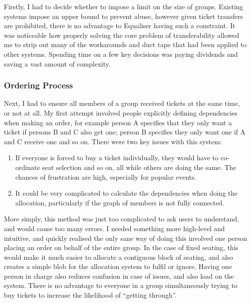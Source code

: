 \documentclass[12pt,a4paper]{bhamdissertation}
\begin{document}
Firstly, I had to decide whether to impose a limit on the size of groups. Existing systems impose an upper bound to prevent abuse, however given ticket transfers are prohibited, there is no advantage to Equaliser having such a constraint. It was noticeable how properly solving the core problem of transferability allowed me to strip out many of the workarounds and duct tape that had been applied to other systems. Spending time on a few key decisions was paying dividends and saving a vast amount of complexity.

\subsubsection{Ordering Process}

Next, I had to ensure all members of a group received tickets at the same time, or not at all. My first attempt involved people explicitly defining dependencies when making an order, for example person A specifies that they only want a ticket if persons B and C also get one; person B specifies they only want one if A and C receive one and so on. There were two key issues with this system:

\begin{enumerate}
    \item If everyone is forced to buy a ticket individually, they would have to co-ordinate seat selection and so on, all while others are doing the same. The chances of frustration are high, especially for popular events.
    \item It could be very complicated to calculate the dependencies when doing the allocation, particularly if the graph of members is not fully connected.
\end{enumerate}

More simply, this method was just too complicated to ask users to understand, and would cause too many errors. I needed something more high-level and intuitive, and quickly realised the only sane way of doing this involved one person placing an order on behalf of the entire group. In the case of fixed seating, this would make it much easier to allocate a contiguous block of seating, and also creates a simple blob for the allocation system to fulfil or ignore. Having one person in charge also reduces confusion in case of issues, and also load on the system. There is no advantage to everyone in a group simultaneously trying to buy tickets to increase the likelihood of ``getting through''.
\end{document}
